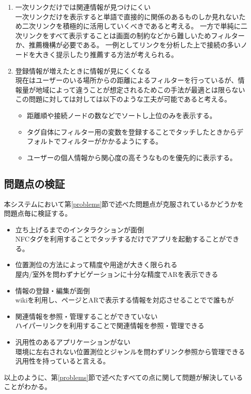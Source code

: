 \begin{enumerate}
  \item 一次リンクだけでは関連情報が見つけにくい\\
  一次リンクだけを表示すると単語で直接的に関係のあるものしか見れないため二次リンクを積極的に活用していくべきであると考える。
  一方で単純に二次リンクをすべて表示することは画面の制約などから難しいためフィルターか、推薦機構が必要である。
  一例としてリンクを分析した上で接続の多いノードを大きく提示したり推薦する方法が考えられる。
  \item 登録情報が増えたときに情報が見にくくなる\\
  現在はユーザーのいる場所からの距離によるフィルターを行っているが、情報量が地域によって違うことが想定されるためこの手法が最適とは限らない
  この問題に対しては対しては以下のような工夫が可能であると考える。
  \begin{itemize}
    \item 距離順や接続ノードの数などでソートし上位のみを表示する。
    \item タグ自体にフィルター用の変数を登録することでタッチしたときからデフォルトでフィルターがかかるようにする。
    \item ユーザーの個人情報から関心度の高そうなものを優先的に表示する。
  \end{itemize}
   
\end{enumerate}

\subsection{問題点の検証}
本システムにおいて第\ref{problems}節で述べた問題点が克服されているかどうかを問題点毎に検証する。
\begin{itemize}
  \item 立ち上げるまでのインタラクションが面倒 \\
  NFCタグを利用することでタッチするだけでアプリを起動することができる。
  \item 位置測位の方法によって精度や用途が大きく限られる \\
  屋内/室外を問わずナビゲーションに十分な精度でARを表示できる
  \item 情報の登録・編集が面倒 \\
  wikiを利用し、ページとARで表示する情報を対応させることでで誰もが
  \item 関連情報を参照・管理することができていない \\
  ハイパーリンクを利用することで関連情報を参照・管理できる
  \item 汎用性のあるアプリケーションがない \\
  環境に左右されない位置測位とジャンルを問わずリンク参照から管理できる汎用性を持っていると言える。
\end{itemize}
以上のように、第\ref{problems}節で述べたすべての点に関して問題が解決していることがわかる。